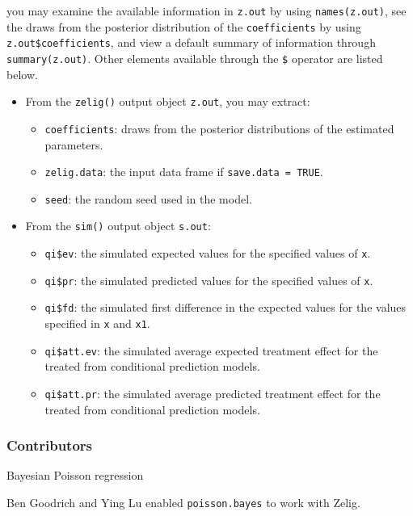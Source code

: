 \noindent you may examine the available information in \texttt{z.out} by
using \texttt{names(z.out)}, see the draws from the posterior distribution of
the \texttt{coefficients} by using \texttt{z.out\$coefficients}, and view a 
default summary of information through \texttt{summary(z.out)}. Other elements
available through the \texttt{\$} operator are listed below.

\begin{itemize}
\item From the \texttt{zelig()} output object \texttt{z.out}, you may extract:

\begin{itemize}
\item \texttt{coefficients}: draws from the posterior distributions
of the estimated parameters.

   \item {\tt zelig.data}: the input data frame if {\tt save.data = TRUE}.  
\item \texttt{seed}: the random seed used in the model.

\end{itemize}

\item From the \texttt{sim()} output object \texttt{s.out}:

\begin{itemize}
\item \texttt{qi\$ev}: the simulated expected values for the specified
values of \texttt{x}.

\item \texttt{qi\$pr}: the simulated predicted values for the specified values
of \texttt{x}.

\item \texttt{qi\$fd}: the simulated first difference in the expected
values for the values specified in \texttt{x} and \texttt{x1}.

\item \texttt{qi\$att.ev}: the simulated average expected treatment effect
for the treated from conditional prediction models.

\item \texttt{qi\$att.pr}: the simulated average predicted treatment effect
for the treated from conditional prediction models.
\end{itemize}
\end{itemize}

\subsubsection{Contributors}
Bayesian Poisson regression 

\noindent Ben Goodrich and Ying Lu enabled \texttt{poisson.bayes} to work with Zelig.


